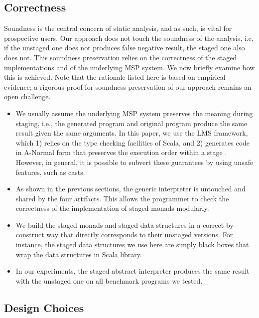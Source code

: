 \subsection{Correctness}

Soundness is the central concern of static analysis, and as such, is vital for
prospective users. Our approach does not touch the soundness of the analysis,
i.e, if the unstaged one does not produces false negative result, the staged
one also does not. This soundness preservation relies on the correctness
of the staged implementations and of the underlying MSP system. We now briefly
examine how this is achieved. Note that the rationale listed
here is based on empirical evidence; a rigorous proof for soundness
preservation of our approach remains an open challenge.

\begin{itemize}
  \item We usually assume the underlying MSP system preserves the meaning
    during staging, i.e., the generated program and original program produce
    the same result given the same arguments.
    In this paper, we use the LMS framework, which 1) relies on the
    type checking facilities of Scala, and 2) generates code in A-Normal form
    \cite{Flanagan:1993:ECC:155090.155113} that preserves the execution order
    within a stage \cite{DBLP:conf/birthday/Rompf16}.  However, in general, it
    is possible to subvert these guarantees by using unsafe features, such as
    casts.
  \item As shown in the previous sections, the generic interpreter is untouched
    and shared by the four artifacts.  This allows the programmer to
    check the correctness of the implementation of staged monads modularly.
  \item We build the staged monads and staged data structures in a
    correct-by-construct way that directly corresponds to their unstaged
    versions. For instance, the staged data structures we use here are simply
    black boxes that wrap the data structures in Scala library.
  \item In our experiments, the staged abstract interpreter produces the same
    result with the unstaged one on all benchmark programs we tested.
\end{itemize}

\subsection{Design Choices}

